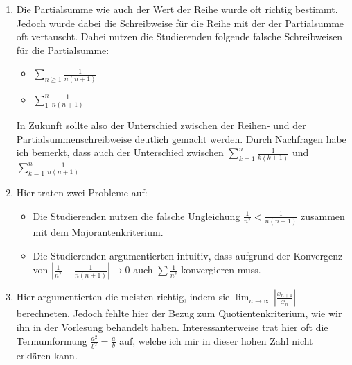\documentclass[a4paper]{article}
\begin{document}
\begin{enumerate}
  \item Die Partialsumme wie auch der Wert der Reihe wurde oft richtig bestimmt. Jedoch wurde dabei die Schreibweise für die Reihe mit der der Partialsumme oft vertauscht. Dabei nutzen die Studierenden folgende falsche Schreibweisen für die Partialsumme:

    \begin{itemize}
      \item $\sum_{n\ge 1} \frac{1}{n(n+1)}$
      \item $\sum_1^n \frac{1}{n(n+1)}$
    \end{itemize}

    In Zukunft sollte also der Unterschied zwischen der Reihen- und der Partialsummenschreibweise deutlich gemacht werden. Durch Nachfragen habe ich bemerkt, dass auch der Unterschied zwischen $\sum_{k=1}^n \frac{1}{k(k+1)}$ und $\sum_{k=1}^n \frac{1}{n(n+1)}$

  \item Hier traten zwei Probleme auf:

    \begin{itemize}
      \item Die Studierenden nutzen die falsche Ungleichung $\frac 1{n^2} < \frac{1}{n(n+1)}$ zusammen mit dem Majorantenkriterium.
      \item Die Studierenden argumentierten intuitiv, dass aufgrund der Konvergenz von $\left|\frac 1{n^2} - \frac{1}{n(n+1)}\right|\to 0$ auch $\sum \frac {1}{n^2}$ konvergieren muss.
    \end{itemize}

  \item Hier argumentierten die meisten richtig, indem sie $\lim_{n\to\infty} \left|\frac{x_{n+1}}{x_n}\right|$ berechneten. Jedoch fehlte hier der Bezug zum Quotientenkriterium, wie wir ihn in der Vorlesung behandelt haben. Interessanterweise trat hier oft die Termumformung $\frac{a^2}{b^2} = \frac ab$ auf, welche ich mir in dieser hohen Zahl nicht erklären kann.
\end{enumerate}
\end{document}
